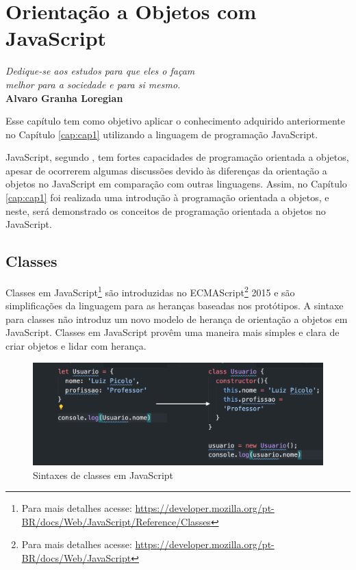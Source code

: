 \setcounter{chapter}{1}
\chapter{Orientação a Objetos com JavaScript}

\begin{flushright}
	\textit{
		Dedique-se aos estudos para que eles o façam \\
		melhor para a sociedade e para si mesmo.
	} \\
	
	\textbf{Alvaro Granha Loregian}
\end{flushright}

Esse capítulo tem como objetivo aplicar o conhecimento adquirido anteriormente no Capítulo \ref{cap:cap1} utilizando a linguagem de programação JavaScript. 

JavaScript, segundo , tem fortes capacidades de programação orientada a objetos, apesar de ocorrerem algumas discussões devido às diferenças da orientação a objetos no JavaScript em comparação com outras linguagens. Assim, no Capítulo \ref{cap:cap1} foi realizada uma introdução à programação orientada a objetos, e neste, será demonstrado os conceitos de programação orientada a objetos no JavaScript.

\section{Classes}

Classes em JavaScript\footnote{Para mais detalhes acesse: \url{https://developer.mozilla.org/pt-BR/docs/Web/JavaScript/Reference/Classes}} são introduzidas no ECMAScript\footnote{Para mais detalhes acesse: \url{https://developer.mozilla.org/pt-BR/docs/Web/JavaScript}} 2015 e são simplificações da linguagem para as heranças baseadas nos protótipos. A sintaxe para classes não introduz um novo modelo de herança de orientação a objetos em JavaScript. Classes em JavaScript provêm uma maneira mais simples e clara de criar objetos e lidar com herança.

\begin{figure}[H]
	\centering
	\includegraphics[scale=0.35]{imagens/classes-antes-depois.png}
	\caption{Sintaxes de classes em JavaScript}
	\label{fig:sintaxe-classe-js}
\end{figure}

